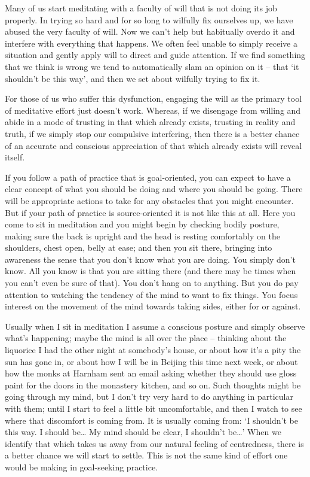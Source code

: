 Many of us start meditating with a faculty of will that is not doing its
job properly. In trying so hard and for so long to wilfully fix
ourselves up, we have abused the very faculty of will. Now we can't
help but habitually overdo it and interfere with everything that
happens. We often feel unable to simply receive a situation and gently
apply will to direct and guide attention. If we find something that we
think is wrong we tend to automatically slam an opinion on it -- that
`it shouldn't be this way', and then we set about wilfully trying to fix
it.

For those of us who suffer this dysfunction, engaging the will as the
primary tool of meditative effort just doesn't work. Whereas, if we
disengage from willing and abide in a mode of trusting in that which
already exists, trusting in reality and truth, if we simply stop our
compulsive interfering, then there is a better chance of an accurate and conscious appreciation of
that which already exists will reveal itself.

If you follow a path of practice that is goal-oriented, you can expect
to have a clear concept of what you should be doing and where you should
be going. There will be appropriate actions to take for any obstacles
that you might encounter. But if your path of practice is
source-oriented it is not like this at all. Here you come to sit in
meditation and you might begin by checking bodily posture, making sure
the back is upright and the head is resting comfortably on the
shoulders, chest open, belly at ease; and then you sit there, bringing
into awareness the sense that you don't know what you are doing. You
simply don't know. All you know is that you are sitting there (and there
may be times when you can't even be sure of that). You don't hang on to
anything. But you do pay attention to watching the tendency of the mind
to want to fix things. You focus interest on the movement of the mind
towards taking sides, either for or against.

Usually when I sit in meditation I assume a conscious
posture and simply observe what's happening; maybe the mind is all over
the place -- thinking about the liquorice I had the other night at
somebody's house, or about how it's a pity the sun has gone in, or about
how I will be in Beijing this time next week, or about how the monks at
Harnham sent an email asking whether they should use gloss paint for the
doors in the monastery kitchen, and so on. Such thoughts might be going
through my mind, but I don't try very hard to do anything in particular with them;
until I start to feel a little bit uncomfortable,
and then I watch to see where that discomfort is coming from. It is
usually coming from: `I shouldn't be this way. I should
be\ldots{} My mind should be clear, I shouldn't be\ldots{}'
When we identify that which takes us away
from our natural feeling of centredness, there is a better chance we will start to settle. This is not the
same kind of effort one would be making in goal-seeking practice.

